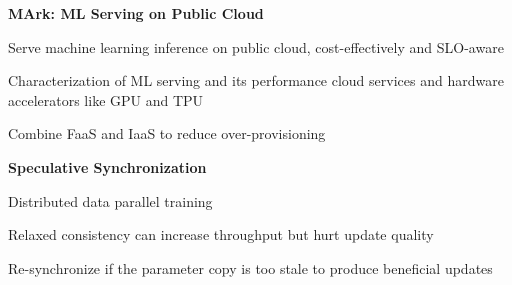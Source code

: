 \documentclass[12pt]{article}
\renewcommand{\section}[2]%
        {\pagebreak[2]\vspace{1.3\baselineskip}%
         \phantomsection\addcontentsline{toc}{section}{#1}%
         \hspace{0in}%
         \marginpar{
         \raggedright \scshape #1}#2}
\newenvironment{innerlist}[1][\textbullet]%
        {\begin{compactenum}[#1]}{\end{compactenum}}
\begin{document}
\textbf{MArk: ML Serving on Public Cloud}
\vspace{2pt}
\begin{compactenum}[-]
\item Serve machine learning inference on public cloud, cost-effectively and SLO-aware
\item Characterization of ML serving and its performance cloud services and hardware accelerators like GPU and TPU
\item Combine FaaS and IaaS to reduce over-provisioning
\end{compactenum}
\vspace{5pt}

\textbf{Speculative Synchronization}
\vspace{2pt}
\begin{compactenum}[-]
\item Distributed data parallel training
\item Relaxed consistency can increase throughput but hurt update quality
\item Re-synchronize if the parameter copy is too stale to produce beneficial updates
\end{compactenum}


\end{document}
